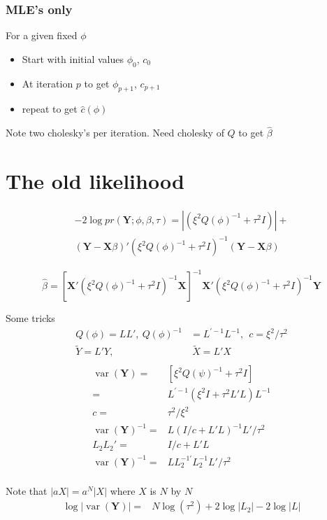 \documentclass[12pt]{article}
\DeclareMathOperator{\var}{var}
\begin{document}
\subsubsection*{MLE's only}
For a given fixed $\phi$
\begin{itemize}
  \item Start with initial values  $\phi_0$, $c_0$
  \item At iteration $p$  to get $\phi_{p+1}$, $c_{p+1}$
  \item repeat to get $\hat c(\phi)$
\end{itemize}
Note two cholesky's per iteration. Need cholesky of $Q$ to get $\hat\beta$



\section*{The old likelihood}
\begin{multline*}
-2 \log pr(\mathbf{Y};\phi,\beta,\tau) =
| (\xi^2  Q(\phi)^{-1} + \tau^2 I  ) | + \\
( \mathbf{Y} -\mathbf{X}\beta)  '
  (\xi^2  Q(\phi)^{-1} + \tau^2 I  )^{-1}
(\mathbf{Y} - \mathbf{X}\beta)
\end{multline*}

\[
\hat\beta = [ \mathbf{X}'
(  \xi^2  Q(\phi)^{-1} + \tau^2 I )^{-1}   \mathbf{X}]^{-1}
\mathbf{X}'(\xi^2  Q(\phi)^{-1} +
\tau^2 I  )^{-1} \mathbf{Y}
\]

Some tricks
\begin{align*}
 Q(\phi) = L L',\   Q(\phi)^{-1} &=L^{\prime-1} L^{-1}, \ \  c = \xi^2/\tau^2 \\
\tilde Y = L' Y,&  \  \tilde X = L' X\\
\end{align*}
\begin{align*}
\var(\mathbf{Y}) =&  [ \xi^2 Q(\psi)^{-1} +  \tau^2 I] \\
= &    L^{\prime -1}(  \xi^2I +   \tau^2 L'L  ) L^{-1}\\
c = & \tau^2/\xi^2\\
\var(\mathbf{Y})^{-1} = &    L(   I/c +   L'L   )^{-1} L' / \tau^2\\
L_2 L_2' = & I/c +    L'L \\
\var(\mathbf{Y})^{-1} = &    L L_2^{-1\prime} L_2^{-1} L' / \tau^2\\
\end{align*}


Note that $|aX| = a^N|X|$ where $X$ is $N$ by $N$
\begin{align*}
\log |\var(\mathbf{Y})| = & N \log(\tau^2) + 2 \log |L_2| - 2 \log |L|\\
\end{align*}
\end{document}
